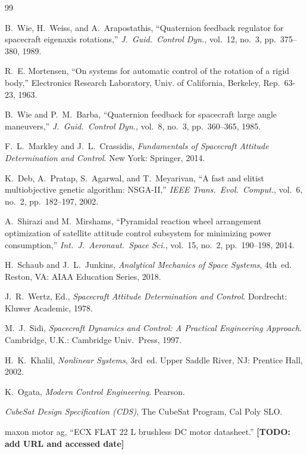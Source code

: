 \documentclass[conference,10pt,a4paper]{IEEEtran}
\newcommand{\TODO}[1]{\textbf{[TODO: #1]}}
\newcommand{\TODO}[1]{}
\begin{document}
\begin{thebibliography}{99}

B.~Wie, H.~Weiss, and A.~Arapostathis, ``Quaternion feedback regulator for
spacecraft eigenaxis rotations,'' \emph{J.\ Guid.\ Control Dyn.}, vol.~12,
no.~3, pp.~375--380, 1989.

R.~E. Mortensen, ``On systems for automatic control of the rotation of a
rigid body,'' Electronics Research Laboratory, Univ. of California,
Berkeley, Rep.~63-23, 1963.

B.~Wie and P.~M.~Barba, ``Quaternion feedback for spacecraft large angle
maneuvers,'' \emph{J.\ Guid.\ Control Dyn.}, vol.~8, no.~3, pp.~360--365, 1985.

F.~L.~Markley and J.~L.~Crassidis, \emph{Fundamentals of Spacecraft Attitude
Determination and Control}. New York: Springer, 2014.

K.~Deb, A.~Pratap, S.~Agarwal, and T.~Meyarivan, ``A fast and elitist
multiobjective genetic algorithm: NSGA-II,'' \emph{IEEE Trans.\ Evol.\
Comput.}, vol.~6, no.~2, pp.~182--197, 2002.

A.~Shirazi and M.~Mirshams, ``Pyramidal reaction wheel arrangement optimization
of satellite attitude control subsystem for minimizing power consumption,''
\emph{Int.\ J.\ Aeronaut.\ Space Sci.}, vol.~15, no.~2, pp.~190--198, 2014.

H.~Schaub and J.~L.~Junkins, \emph{Analytical Mechanics of Space Systems},
4th~ed. Reston, VA: AIAA Education Series, 2018.

J.~R.~Wertz, Ed., \emph{Spacecraft Attitude Determination and Control}.
Dordrecht: Kluwer Academic, 1978.

M.~J.~Sidi, \emph{Spacecraft Dynamics and Control: A Practical Engineering
Approach}. Cambridge, U.K.: Cambridge Univ.\ Press, 1997.

H.~K.~Khalil, \emph{Nonlinear Systems}, 3rd~ed. Upper Saddle River, NJ:
Prentice Hall, 2002.

K.~Ogata, \emph{Modern Control Engineering}. Pearson.

\emph{CubeSat Design Specification (CDS)}, The CubeSat Program, Cal Poly SLO.

maxon motor ag, ``ECX FLAT 22 L brushless DC motor datasheet.''
\TODO{add URL and accessed date}

\end{thebibliography}
\end{document}
